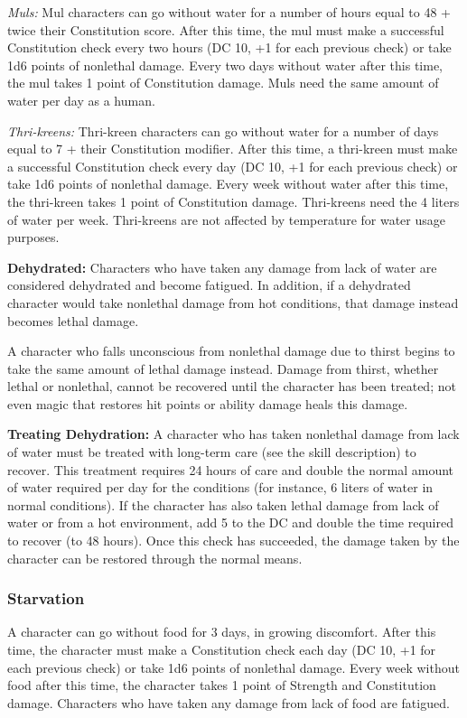 \textit{Muls:} Mul characters can go without water for a number of hours equal to 48 + twice their Constitution score. After this time, the mul must make a successful Constitution check every two hours (DC 10, +1 for each previous check) or take 1d6 points of nonlethal damage. Every two days without water after this time, the mul takes 1 point of Constitution damage. Muls need the same amount of water per day as a human.

\textit{Thri-kreens:} Thri-kreen characters can go without water for a number of days equal to 7 + their Constitution modifier. After this time, a thri-kreen must make a successful Constitution check every day (DC 10, +1 for each previous check) or take 1d6 points of nonlethal damage. Every week without water after this time, the thri-kreen takes 1 point of Constitution damage. Thri-kreens need the 4 liters of water per week. Thri-kreens are not affected by temperature for water usage purposes.

\textbf{Dehydrated:} Characters who have taken any damage from lack of water are considered dehydrated and become fatigued. In addition, if a dehydrated character would take nonlethal damage from hot conditions, that damage instead becomes lethal damage.

A character who falls unconscious from nonlethal damage due to thirst begins to take the same amount of lethal damage instead. Damage from thirst, whether lethal or nonlethal, cannot be recovered until the character has been treated; not even magic that restores hit points or ability damage heals this damage.

\textbf{Treating Dehydration:} A character who has taken nonlethal damage from lack of water must be treated with long-term care (see the  skill description) to recover. This treatment requires 24 hours of care and double the normal amount of water required per day for the conditions (for instance, 6 liters of water in normal conditions). If the character has also taken lethal damage from lack of water or from a hot environment, add 5 to the  DC and double the time required to recover (to 48 hours). Once this  check has succeeded, the damage taken by the character can be restored through the normal means.


\subsubsection{Starvation}
A character can go without food for 3 days, in growing discomfort. After this time, the character must make a Constitution check each day (DC 10, +1 for each previous check) or take 1d6 points of nonlethal damage. Every week without food after this time, the character takes 1 point of Strength and Constitution damage. Characters who have taken any damage from lack of food are fatigued.


